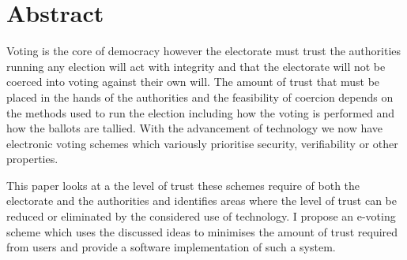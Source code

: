 \newpage
\vspace*{\fill}

\section*{Abstract}

Voting is the core of democracy however the electorate must trust the authorities running any election will act with integrity and that the electorate will not be coerced into voting against their own will.
The amount of trust that must be placed in the hands of the authorities and the feasibility of coercion depends on the methods used to run the election including how the voting is performed and how the ballots are tallied.
With the advancement of technology we now have electronic voting schemes which variously prioritise security, verifiability or other properties.

This paper looks at a the level of trust these schemes require of both the electorate and the authorities and identifies areas where the level of trust can be reduced or eliminated by the considered use of technology.
I propose an e-voting scheme which uses the discussed ideas to minimises the amount of trust required from users and provide a software implementation of such a system.

\vspace*{\fill}
